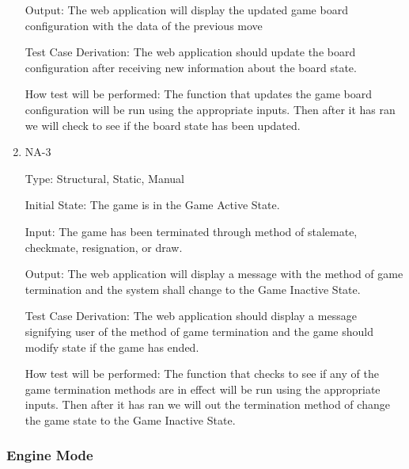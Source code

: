 \documentclass[12pt, titlepage]{article}
\begin{document}
\begin{enumerate}
    Output: The web application will display the updated game board configuration with the data
    of the previous move
                        
    Test Case Derivation: The web application should update the board configuration after receiving new information about the board state. 

    How test will be performed: The function that updates the game board configuration
    will be run using the appropriate inputs. Then after it has ran we will check to see if the board state has been updated.

    \item{NA-3\\}

    Type: Structural, Static, Manual
                      
    Initial State: The game is in the Game Active State.
                        
    Input: The game has been terminated through method of stalemate, checkmate, resignation, or draw.
                        
    Output: The web application will display a message with the method of game termination and the
    system shall change to the Game Inactive State.
                        
    Test Case Derivation: The web application should display a message signifying user of the method of game termination
    and the game should modify state if the game has ended.

    How test will be performed: The function that checks to see if any of the game termination methods are in effect
    will be run using the appropriate inputs. Then after it has ran we will out the termination method of change the
    game state to the Game Inactive State.

  \end{enumerate}

  \subsubsection{Engine Mode}
\end{document}
